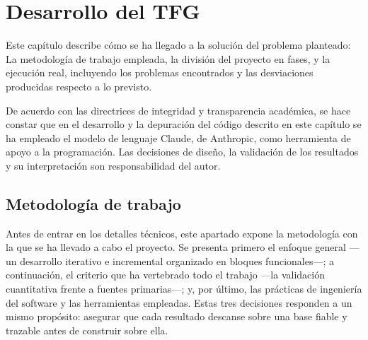 \chapter{Desarrollo del TFG}
\label{ch:desarrollo}

Este capítulo describe cómo se ha llegado a la solución del problema planteado: La metodología de trabajo empleada, la división del proyecto en fases, y la ejecución real, incluyendo los problemas encontrados y las desviaciones producidas respecto a lo previsto.

De acuerdo con las directrices de integridad y transparencia académica, se hace constar que en el desarrollo y la depuración del código descrito en este capítulo se ha empleado el modelo de lenguaje Claude, de Anthropic, como herramienta de apoyo a la programación. Las decisiones de diseño, la validación de los resultados y su interpretación son responsabilidad del autor.

\section{Metodología de trabajo}
\label{sec:metodologia}

Antes de entrar en los detalles técnicos, este apartado expone la metodología con la que se ha llevado a cabo el proyecto. Se presenta primero el enfoque general ---un desarrollo iterativo e incremental organizado en bloques funcionales---; a continuación, el criterio que ha vertebrado todo el trabajo ---la validación cuantitativa frente a fuentes primarias---; y, por último, las prácticas de ingeniería del software y las herramientas empleadas. Estas tres decisiones responden a un mismo propósito: asegurar que cada resultado descanse sobre una base fiable y trazable antes de construir sobre ella.

